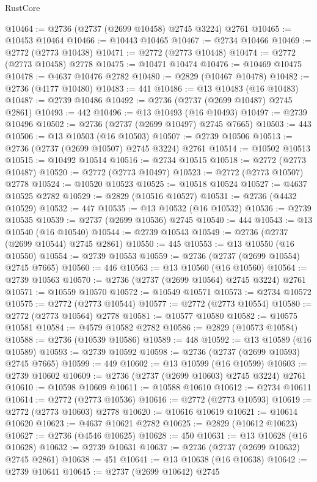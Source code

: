 \begin{lexlean}{RustCore}
\begin{coremodule}
@10464 := @2736 (@2737 (@2699 @10458) @2745 @3224) @2761
@10465 := @10453 @10464
@10466 := @10443 @10465
@10467 := @2734 @10466
@10469 := @2772 (@2773 @10438)
@10471 := @2772 (@2773 @10448)
@10474 := @2772 (@2773 @10458) @2778
@10475 := @10471 @10474
@10476 := @10469 @10475
@10478 := @4637 @10476 @2782
@10480 := @2829 (@10467 @10478)
@10482 := @2736 (@4177 @10480)
@10483 := 441
@10486 := @13 @10483 (@16 @10483)
@10487 := @2739 @10486
@10492 := @2736 (@2737 (@2699 @10487) @2745 @2861)
@10493 := 442
@10496 := @13 @10493 (@16 @10493)
@10497 := @2739 @10496
@10502 := @2736 (@2737 (@2699 @10497) @2745 @7665)
@10503 := 443
@10506 := @13 @10503 (@16 @10503)
@10507 := @2739 @10506
@10513 := @2736 (@2737 (@2699 @10507) @2745 @3224) @2761
@10514 := @10502 @10513
@10515 := @10492 @10514
@10516 := @2734 @10515
@10518 := @2772 (@2773 @10487)
@10520 := @2772 (@2773 @10497)
@10523 := @2772 (@2773 @10507) @2778
@10524 := @10520 @10523
@10525 := @10518 @10524
@10527 := @4637 @10525 @2782
@10529 := @2829 (@10516 @10527)
@10531 := @2736 (@4432 @10529)
@10532 := 447
@10535 := @13 @10532 (@16 @10532)
@10536 := @2739 @10535
@10539 := @2737 (@2699 @10536) @2745
@10540 := 444
@10543 := @13 @10540 (@16 @10540)
@10544 := @2739 @10543
@10549 := @2736 (@2737 (@2699 @10544) @2745 @2861)
@10550 := 445
@10553 := @13 @10550 (@16 @10550)
@10554 := @2739 @10553
@10559 := @2736 (@2737 (@2699 @10554) @2745 @7665)
@10560 := 446
@10563 := @13 @10560 (@16 @10560)
@10564 := @2739 @10563
@10570 := @2736 (@2737 (@2699 @10564) @2745 @3224) @2761
@10571 := @10559 @10570
@10572 := @10549 @10571
@10573 := @2734 @10572
@10575 := @2772 (@2773 @10544)
@10577 := @2772 (@2773 @10554)
@10580 := @2772 (@2773 @10564) @2778
@10581 := @10577 @10580
@10582 := @10575 @10581
@10584 := @4579 @10582 @2782
@10586 := @2829 (@10573 @10584)
@10588 := @2736 (@10539 @10586)
@10589 := 448
@10592 := @13 @10589 (@16 @10589)
@10593 := @2739 @10592
@10598 := @2736 (@2737 (@2699 @10593) @2745 @7665)
@10599 := 449
@10602 := @13 @10599 (@16 @10599)
@10603 := @2739 @10602
@10609 := @2736 (@2737 (@2699 @10603) @2745 @3224) @2761
@10610 := @10598 @10609
@10611 := @10588 @10610
@10612 := @2734 @10611
@10614 := @2772 (@2773 @10536)
@10616 := @2772 (@2773 @10593)
@10619 := @2772 (@2773 @10603) @2778
@10620 := @10616 @10619
@10621 := @10614 @10620
@10623 := @4637 @10621 @2782
@10625 := @2829 (@10612 @10623)
@10627 := @2736 (@4546 @10625)
@10628 := 450
@10631 := @13 @10628 (@16 @10628)
@10632 := @2739 @10631
@10637 := @2736 (@2737 (@2699 @10632) @2745 @2861)
@10638 := 451
@10641 := @13 @10638 (@16 @10638)
@10642 := @2739 @10641
@10645 := @2737 (@2699 @10642) @2745

\end{coremodule}
\end{lexlean}
